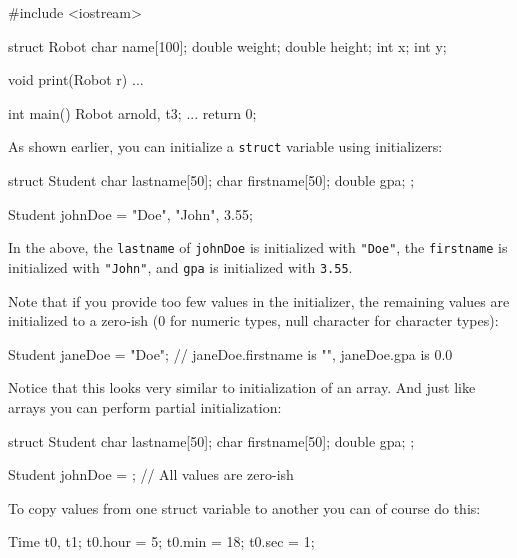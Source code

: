 \begin{center}
\begin{center}
\begin{consolethree}[escapeinside=||]
#include <iostream>

struct Robot
{
    char name[100];
    double weight;
    double height;
    int x;
    int y;
}

void print(Robot r)
{
    ...
}

int main()
{
    Robot arnold, t3;
    ...
    return 0;
}
\end{consolethree}


\newpage{}

As shown earlier, you can initialize a \texttt{struct} variable using initializers:

\begin{consolethree}[escapeinside=||]
struct Student
{
    char lastname[50];
    char firstname[50];
    double gpa;
};

Student johnDoe = {"Doe", "John", 3.55};
\end{consolethree}

In the above, the \texttt{lastname} of \texttt{johnDoe} is initialized
with \verb!"Doe"!, the \texttt{firstname} is initialized with
\verb!"John"!, and \texttt{gpa} is initialized with \texttt{3.55}.

Note that if you provide too few values in the initializer, the remaining
values are initialized to a zero-ish (0 for numeric types, null character
for character types):

\begin{consolethree}[escapeinside=||]
Student janeDoe = {"Doe"};
// janeDoe.firstname is "", janeDoe.gpa is 0.0
\end{consolethree}

Notice that this looks very similar to initialization of an array. And just like
arrays you can perform partial initialization:

\begin{consolethree}[escapeinside=||]
struct Student
{
    char lastname[50];
    char firstname[50];
    double gpa;
};

Student johnDoe = {}; // All values are zero-ish
\end{consolethree}


\newpage{}

To copy values from one struct variable to another you can of course do
this:

\begin{consolethree}[escapeinside=||]
Time t0, t1;
t0.hour = 5;
t0.min = 18;
t0.sec = 1;


\end{consolethree}
\end{center}
\end{center}
